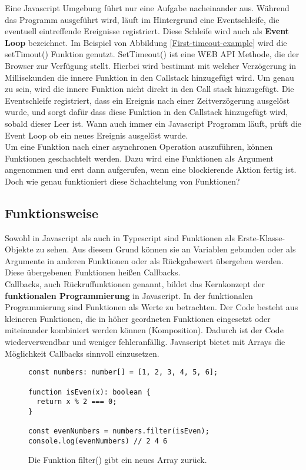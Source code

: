 \noindent
Eine Javascript Umgebung führt nur eine Aufgabe nacheinander aus. Während das Programm ausgeführt wird, läuft im Hintergrund eine Eventschleife, die eventuell eintreffende Ereignisse registriert. Diese Schleife wird auch als \textbf{Event Loop} bezeichnet. Im Beispiel von Abbildung \ref{First-timeout-example} wird die setTimout() Funktion genutzt. SetTimeout() ist eine WEB API Methode, die der Browser zur Verfügung stellt. Hierbei wird bestimmt mit welcher Verzögerung in Millisekunden die innere Funktion in den Callstack hinzugefügt wird. Um genau zu sein, wird die innere Funktion nicht direkt in den Call stack hinzugefügt. Die Eventschleife registriert, dass ein Ereignis nach einer Zeitverzögerung ausgelöst wurde, und sorgt dafür dass diese Funktion in den Callstack hinzugefügt wird, sobald dieser Leer ist. Wann auch immer ein Javascript Programm läuft, prüft die Event Loop ob ein neues Ereignis ausgelöst wurde\cite{regular-event-loop}.\\

\noindent
Um eine Funktion nach einer asynchronen Operation auszuführen, können Funktionen geschachtelt werden. Dazu wird eine Funktionen als Argument angenommen und erst dann aufgerufen, wenn eine blockierende Aktion fertig ist. Doch wie genau funktioniert diese Schachtelung von Funktionen?

\subsection{Funktionsweise}

Sowohl in Javascript als auch in Typescript sind Funktionen als Erste-Klasse-Objekte zu sehen. Aus diesem Grund können sie an Variablen gebunden oder als Argumente in anderen Funktionen oder als Rückgabewert übergeben werden. Diese übergebenen Funktionen heißen Callbacks.\\

\noindent
Callbacks, auch Rückruffunktionen genannt, bildet das Kernkonzept der \textbf{funktionalen Programmierung} in Javascript\cite{callbacks-intro}. In der funktionalen Programmierung sind Funktionen als Werte zu betrachten. Der Code besteht aus kleineren Funktionen, die in höher geordneten Funktionen eingesetzt oder miteinander kombiniert werden können (Komposition). Dadurch ist der Code wiederverwendbar und weniger fehleranfällig. Javascript bietet mit Arrays die Möglichkeit Callbacks sinnvoll einzusetzen.

\begin{figure}[H]
\begin{lstlisting}[basicstyle=\small]
const numbers: number[] = [1, 2, 3, 4, 5, 6];

function isEven(x): boolean { 
  return x % 2 === 0; 
}

const evenNumbers = numbers.filter(isEven);
console.log(evenNumbers) // 2 4 6
\end{lstlisting}
\caption{Die Funktion filter() gibt ein neues Array zurück.}
\label{callbacks-with-arrays}
\end{figure}

